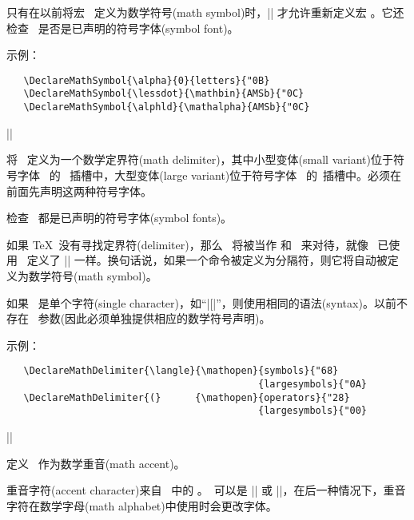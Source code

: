\documentclass{ltxguide}[1995/11/28]
\begin{document}
只有在以前将宏 \ 定义为数学符号(math symbol)时，|\DeclareMathSymbol| 才允许重新定义宏 。它还检查 \ 是否是已声明的符号字体(symbol font)。

示例：
\begin{verbatim}
   \DeclareMathSymbol{\alpha}{0}{letters}{"0B}
   \DeclareMathSymbol{\lessdot}{\mathbin}{AMSb}{"0C}
   \DeclareMathSymbol{\alphld}{\mathalpha}{AMSb}{"0C}
\end{verbatim}

\begin{decl}
  |\DeclareMathDelimiter|  
                           \\
              \null\hfill {} 
\end{decl}
将 \ 定义为一个数学定界符(math delimiter)，其中小型变体(small variant)位于符号字体 \ 的 \ 插槽中，大型变体(large variant)位于符号字体 \ 的\ 插槽中。必须在前面先声明这两种符号字体。

检查 \ 都是已声明的符号字体(symbol fonts)。

如果 \TeX{}\ 没有寻找定界符(delimiter)，那么 \ 将被当作  和 \ 来对待，就像 \ 已使用 \ 定义了 |\DeclareMathSymbol| 一样。换句话说，如果一个命令被定义为分隔符，则它将自动被定义为数学符号(math symbol)。

如果 \ 是单个字符(single character)，如“|[|”，则使用相同的语法(syntax)。以前不存在 \ 参数(因此必须单独提供相应的数学符号声明)。

示例：
\begin{verbatim}
   \DeclareMathDelimiter{\langle}{\mathopen}{symbols}{"68}
                                            {largesymbols}{"0A}
   \DeclareMathDelimiter{(}      {\mathopen}{operators}{"28}
                                            {largesymbols}{"00}
\end{verbatim}


\begin{decl}
  |\DeclareMathAccent|    
\end{decl}

定义 \ 作为数学重音(math accent)。

重音字符(accent character)来自 \ 中的 。\ 可以是 |\mathord| 或 |\mathalpha|，在后一种情况下，重音字符在数学字母(math alphabet)中使用时会更改字体。
\end{document}
